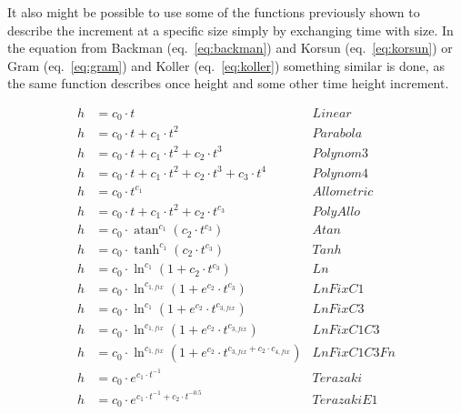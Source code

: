 \documentclass[a4paper,twocolumn]{article}
\DeclareMathOperator{\atan}{atan}
\begin{document}
It also might be possible to use some of the functions previously shown 
to describe the increment at a specific size simply by exchanging
time with size. In the equation from
Backman (eq.~\ref{eq:backman}) and Korsun (eq.~\ref{eq:korsun}) or
Gram (eq.~\ref{eq:gram}) and Koller (eq.~\ref{eq:koller}) something
similar is done, as the same function describes once height and some
other time height increment.

\begin{table*}
\begin{minipage}[t]{.5\textwidth}
\begin{align*}
  \label{eq:linear}
  h & = c_0 \cdot t & Linear \tag{1.0}\\
  \label{eq:parabolar}
  h & = c_0 \cdot t + c_1 \cdot t^2 & Parabola \tag{1.1}\\
  \label{eq:poly3}
  h & = c_0 \cdot t + c_1 \cdot t^2 + c_2 \cdot t^3 & Polynom3 \tag{1.2}\\
  \label{eq:poly4}
  h & = c_0 \cdot t + c_1 \cdot t^2 + c_2 \cdot t^3 + c_3 \cdot t^4 & Polynom4 \tag{1.3}\\
  \label{eq:allometric}
  h & = c_0 \cdot t^{c_1} & Allometric \tag{1.4}\\
  \label{eq:polyAllo}
  h & = c_0 \cdot t + c_1 \cdot t^2 + c_2 \cdot t^{c_3} & PolyAllo
  \tag{1.5}\\[1em]
  \label{eq:atan}
  h & = c_0 \cdot \atan^{c_1} (c_2\cdot t^{c_3}) & Atan \tag{2.0}\\
  \label{eq:tanh}
  h & = c_0 \cdot \tanh^{c_1} (c_2\cdot t^{c_3}) & Tanh \tag{2.1}\\
  \label{eq:ln}
  h & = c_0 \cdot \ln^{c_1} (1 + c_2\cdot t^{c_3}) & Ln \tag{2.2}\\
  \label{eq:lnFixC1}
  h & = c_0 \cdot \ln^{c_{1,fix}} (1 + e^{c_2}\cdot t^{c_3}) & LnFixC1 \tag{2.3}\\
  \label{eq:lnFixC3}
  h & = c_0 \cdot \ln^{c_1} (1 + e^{c_2}\cdot t^{c_{3,fix}}) & LnFixC3 \tag{2.4}\\
  \label{eq:lnFixC1C3}
  h & = c_0 \cdot \ln^{c_{1,fix}} (1 + e^{c_2}\cdot t^{c_{3,fix}}) & LnFixC1C3 \tag{2.5}\\
  \label{eq:lnFixC1C3Fn}
  h & = c_0 \cdot \ln^{c_{1,fix}} (1 + e^{c_2}\cdot t^{c_{3,fix} + c_2\cdot c_{4,fix}}) & LnFixC1C3Fn \tag{2.6}\\[1em]
  \label{eq:terazaki}
  h & = c_0 \cdot e^{c_1\cdot t^{-1}} & Terazaki \tag{3.0}\\ %
  \label{eq:terazakiE1}
  h & = c_0 \cdot e^{c_1\cdot t^{-1} + c_2\cdot t^{-0.5}} & TerazakiE1 \tag{3.1}\\

\end{align*}
\end{minipage}
\end{table*}
\end{document}
